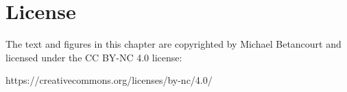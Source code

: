 \documentclass[
  letterpaper,
  DIV=11,
  numbers=noendperiod]{scrartcl}
\begin{document}
\section*{License}\label{license}

The text and figures in this chapter are copyrighted by Michael
Betancourt and licensed under the CC BY-NC 4.0 license:

https://creativecommons.org/licenses/by-nc/4.0/
\end{document}
